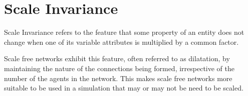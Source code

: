 
\chapter{Scale Invariance} %

\label{AppendixA} %


Scale Invariance refers to the feature that some property of an entity does not change when one of its variable attributes is multiplied by a common factor. 

Scale free networks exhibit this feature, often referred to as dilatation, by maintaining the nature of the connections being formed, irrespective of the number of the agents in the network.
This makes scale free networks more suitable to be used in a simulation that may or may not be need to be scaled. 